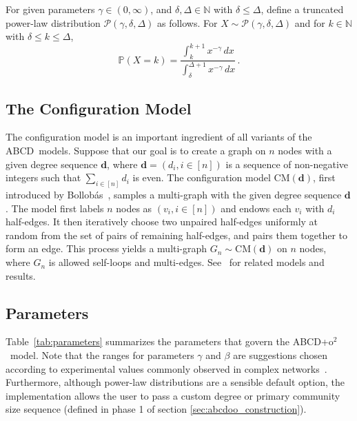 \documentclass[review,los,12pt]{ryethesis}
\newcommand{\N}{{\mathbb N}}
\newcommand{\bP}{{\mathbb P}}
\newcommand{\abcd}{{ABCD}}
\newcommand{\abcdoo}{{ABCD+o$^2$}}
\newcommand{\tpl}[3]{\ensuremath{\mathcal{P}\left(#1,#2,#3\right)}}
\begin{document}
For given parameters $\gamma \in (0, \infty)$, and $\delta, \Delta \in \N$ with $\delta \leq \Delta$, define a truncated power-law distribution $\tpl{\gamma}{\delta}{\Delta}$ as follows.
For $X \sim \tpl{\gamma}{\delta}{\Delta}$ and for $k \in \N$ with $\delta \leq k \leq \Delta$,
\begin{equation}\label{eq:tpl}
\bP(X = k) = \frac{\int_k^{k+1} x^{-\gamma} \, dx}{\int_{\delta}^{\Delta+1} x^{-\gamma} \, dx} \,.
\end{equation}

\subsection{The Configuration Model}\label{sec:configuration_model}
The configuration model is an important ingredient of all variants of the \abcd\ models.
Suppose that our goal is to create a graph on $n$ nodes with a given degree sequence $\textbf{d}$, where $\textbf{d} = (d_i, i \in [n])$ is a sequence of non-negative integers such that $\sum_{i \in [n]} d_i$ is even.
The configuration model $\mathrm{CM}(\textbf{d})$, first introduced by Bollob\'as~\cite{bollobas1980probabilistic}, samples a multi-graph with the given degree sequence $\textbf{d}$.
The model first labels $n$ nodes as $(v_i, i \in [n])$ and endows each $v_i$ with $d_i$ half-edges.
It then iteratively choose two unpaired half-edges uniformly at random from the set of pairs of remaining half-edges, and pairs them together to form an edge.
This process yields a multi-graph $G_n \sim \mathrm{CM}(\textbf{d})$ on $n$ nodes, where $G_n$ is allowed self-loops and multi-edges.
See~\cite{bender1978asymptotic,wormald1984generating,wormald1999models} for related models and results.

\subsection{Parameters}
Table~\ref{tab:parameters} summarizes the parameters that govern the \abcdoo\ model.
Note that the ranges for parameters $\gamma$ and $\beta$ are suggestions chosen according to experimental values commonly observed in complex networks~\cite{barabasi2016network,orman2009comparison}.
Furthermore, although power-law distributions are a sensible default option, the implementation allows the user to pass a custom degree or primary community size sequence (defined in phase 1 of section \ref{sec:abcdoo_construction}).
\end{document}
